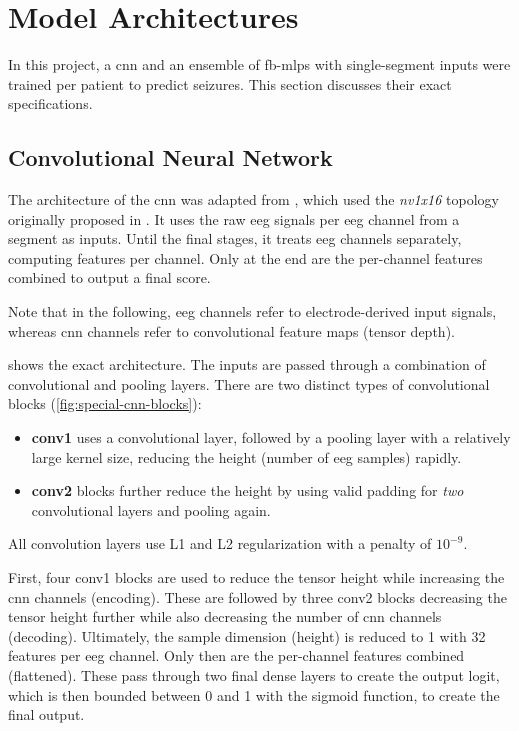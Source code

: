 \section{Model Architectures}\label{sec:model-architectures}
In this project, a \gls{cnn} and an ensemble of \glspl{fb-mlp} with single-segment inputs were trained per patient to predict seizures.
This section discusses their exact specifications.

\subsection{Convolutional Neural Network}\label{subsec:cnn-architecture}
The architecture of the \gls{cnn} was adapted from \textcite{muller_coherent_2022}, which used the \textit{nv1x16} topology originally proposed in \textcite{eberlein_convolutional_2018}.
It uses the raw \gls{eeg} signals per \gls{eeg} channel from a segment as inputs.
Until the final stages, it treats \gls{eeg} channels separately, computing features per channel.
Only at the end are the per-channel features combined to output a final score.

Note that in the following, \gls{eeg} channels refer to electrode-derived input signals, whereas \gls{cnn} channels refer to convolutional feature maps (tensor depth).

 shows the exact architecture.
The inputs are passed through a combination of convolutional and pooling layers.
There are two distinct types of convolutional blocks (\cref{fig:special-cnn-blocks}):
\begin{itemize}
    \item \textbf{conv1} uses a convolutional layer, followed by a pooling layer with a relatively large kernel size, reducing the height (number of \gls{eeg} samples) rapidly.
    \item \textbf{conv2} blocks further reduce the height by using valid padding for \textit{two} convolutional layers and pooling again.
\end{itemize}
All convolution layers use L1 and L2 regularization with a penalty of $10^{-9}$.

First, four conv1 blocks are used to reduce the tensor height while increasing the \gls{cnn} channels (encoding).
These are followed by three conv2 blocks decreasing the tensor height further while also decreasing the number of \gls{cnn} channels (decoding).
Ultimately, the sample dimension (height) is reduced to 1 with 32 features per \gls{eeg} channel.
Only then are the per-channel features combined (flattened).
These pass through two final dense layers to create the output logit, which is then bounded between 0 and 1 with the sigmoid function, to create the final output.

